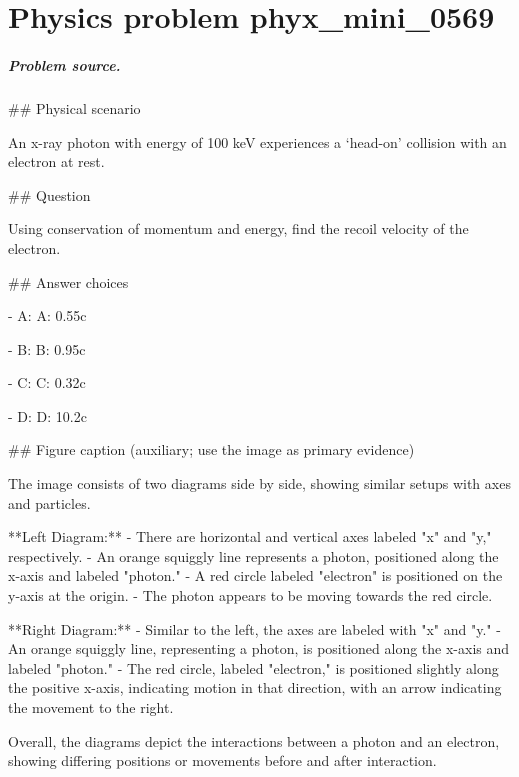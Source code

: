 
\chapter{Physics problem phyx\_mini\_0569}
\label{ch:PhyXMiniProblems_problem_phyx_mini_0569}

\paragraph{Problem source.}
\#\# Physical scenario

An x-ray photon with energy of 100 keV experiences a ‘head-on’ collision with an electron at rest.

\#\# Question

Using conservation of momentum and energy, find the recoil velocity of the electron.

\#\# Answer choices

- A: A: 0.55c

- B: B: 0.95c

- C: C: 0.32c

- D: D: 10.2c

\#\# Figure caption (auxiliary; use the image as primary evidence)

The image consists of two diagrams side by side, showing similar setups with axes and particles.

**Left Diagram:**
- There are horizontal and vertical axes labeled "x" and "y," respectively.
- An orange squiggly line represents a photon, positioned along the x-axis and labeled "photon."
- A red circle labeled "electron" is positioned on the y-axis at the origin.
- The photon appears to be moving towards the red circle.

**Right Diagram:**
- Similar to the left, the axes are labeled with "x" and "y."
- An orange squiggly line, representing a photon, is positioned along the x-axis and labeled "photon."
- The red circle, labeled "electron," is positioned slightly along the positive x-axis, indicating motion in that direction, with an arrow indicating the movement to the right.

Overall, the diagrams depict the interactions between a photon and an electron, showing differing positions or movements before and after interaction.

